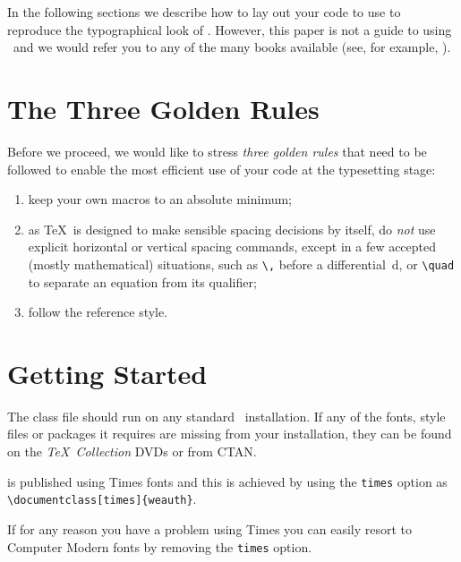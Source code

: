 \documentclass[times]{weauth}
\begin{document}
In the following sections we describe how to lay out your code to
use \textsf{\journalclass} to reproduce the typographical look of
\emph{\journalnamelc}. However, this paper is not a guide to
using \LaTeXe\ and we would refer you to any of the many books
available (see, for example, \cite{R1,R2,R3}).

\section{The Three Golden Rules}

Before we proceed, we would like to stress \emph{three golden
rules} that need to be followed to enable the most efficient use
of your code at the typesetting stage:
\begin{enumerate}
\item[(i)] keep your own macros to an absolute minimum;

\item[(ii)] as \TeX\ is designed to make sensible spacing
decisions by itself, do \emph{not} use explicit horizontal or
vertical spacing commands, except in a few accepted (mostly
mathematical) situations, such as \verb"\," before a
differential~d, or \verb"\quad" to separate an equation from its
qualifier;

\item[(iii)] follow the \emph{\journalnamelc} reference style.
\end{enumerate}

\section{Getting Started} The \textsf{\journalclassshort} class file should run
on any standard \LaTeXe\ installation. If any of the fonts, style
files or packages it requires are missing from your installation,
they can be found on the \emph{\TeX\ Collection} DVDs or from
CTAN.

\emph{\journalnamelc} is published using Times fonts and this is
achieved by using the \verb"times"
option as\\
\verb"\documentclass[times]{weauth}".

\noindent If for any reason you have a problem using Times you can
easily resort to Computer Modern fonts by removing the
\verb"times" option.
\end{document}

